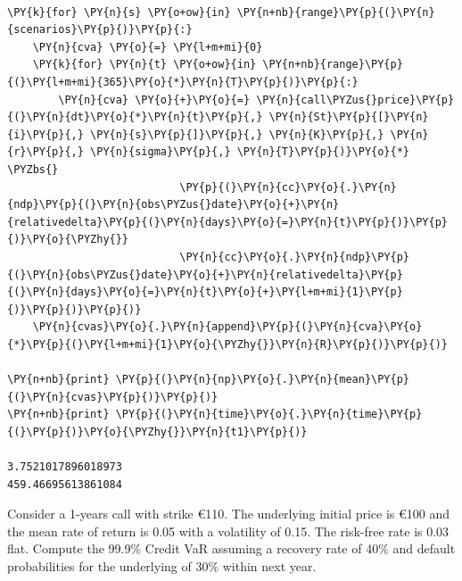 \begin{Answer}
\begin{codebox}[size=fbox, boxrule=1pt, colback=cellbackground, colframe=cellborder]
\begin{Verbatim}[commandchars=\\\{\}]
	
\PY{k}{for} \PY{n}{s} \PY{o+ow}{in} \PY{n+nb}{range}\PY{p}{(}\PY{n}{scenarios}\PY{p}{)}\PY{p}{:}
    \PY{n}{cva} \PY{o}{=} \PY{l+m+mi}{0}
    \PY{k}{for} \PY{n}{t} \PY{o+ow}{in} \PY{n+nb}{range}\PY{p}{(}\PY{l+m+mi}{365}\PY{o}{*}\PY{n}{T}\PY{p}{)}\PY{p}{:} 
        \PY{n}{cva} \PY{o}{+}\PY{o}{=} \PY{n}{call\PYZus{}price}\PY{p}{(}\PY{n}{dt}\PY{o}{*}\PY{n}{t}\PY{p}{,} \PY{n}{St}\PY{p}{[}\PY{n}{i}\PY{p}{,} \PY{n}{s}\PY{p}{]}\PY{p}{,} \PY{n}{K}\PY{p}{,} \PY{n}{r}\PY{p}{,} \PY{n}{sigma}\PY{p}{,} \PY{n}{T}\PY{p}{)}\PY{o}{*} \PYZbs{}
                           \PY{p}{(}\PY{n}{cc}\PY{o}{.}\PY{n}{ndp}\PY{p}{(}\PY{n}{obs\PYZus{}date}\PY{o}{+}\PY{n}{relativedelta}\PY{p}{(}\PY{n}{days}\PY{o}{=}\PY{n}{t}\PY{p}{)}\PY{p}{)}\PY{o}{\PYZhy{}}
                           \PY{n}{cc}\PY{o}{.}\PY{n}{ndp}\PY{p}{(}\PY{n}{obs\PYZus{}date}\PY{o}{+}\PY{n}{relativedelta}\PY{p}{(}\PY{n}{days}\PY{o}{=}\PY{n}{t}\PY{o}{+}\PY{l+m+mi}{1}\PY{p}{)}\PY{p}{)}\PY{p}{)}        
    \PY{n}{cvas}\PY{o}{.}\PY{n}{append}\PY{p}{(}\PY{n}{cva}\PY{o}{*}\PY{p}{(}\PY{l+m+mi}{1}\PY{o}{\PYZhy{}}\PY{n}{R}\PY{p}{)}\PY{p}{)}
				
\PY{n+nb}{print} \PY{p}{(}\PY{n}{np}\PY{o}{.}\PY{n}{mean}\PY{p}{(}\PY{n}{cvas}\PY{p}{)}\PY{p}{)}
\PY{n+nb}{print} \PY{p}{(}\PY{n}{time}\PY{o}{.}\PY{n}{time}\PY{p}{(}\PY{p}{)}\PY{o}{\PYZhy{}}\PY{n}{t1}\PY{p}{)}

3.7521017896018973
459.46695613861084
\end{Verbatim}
\end{codebox}
\end{Answer}

\begin{Exercise}[title={(Credit VaR)}]
Consider a 1-years call with strike \euro{110}. The underlying initial price is \euro{100} and the mean rate of return is 0.05 with a volatility of 0.15. The risk-free rate is 0.03 flat.
Compute the 99.9\% Credit VaR assuming a recovery rate of 40\% and default probabilities for the underlying of 30\% within next year.
\end{Exercise}


